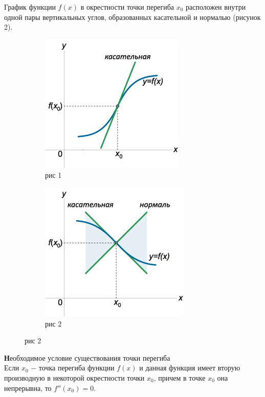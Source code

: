 \documentclass[oneside]{book}
\begin{document}
\begin{enumerate}
\begin{itemize}
\begin{enumerate}
График функции $f\left( x \right)$ в окрестности точки перегиба ${x_0}$ расположен внутри одной пары вертикальных углов, образованных касательной и нормалью (рисунок 2).
\begin{figure}
\centering
\begin{subfigure}{.5\textwidth}
  \centering
  \includegraphics[width=.7\linewidth]{./pics/yyy.jpg}
  \caption{рис 1}
\end{subfigure}%
\begin{subfigure}{.5\textwidth}
  \centering
  \includegraphics[width=.7\linewidth]{./pics/yyy2.jpg}
  \caption{рис 2}
\end{subfigure}
\end{figure}
{\textbf Необходимое условие существования точки перегиба} \\
Если ${x_0}$ − точка перегиба функции $f\left( x \right)$ и данная функция имеет вторую производную в некоторой окрестности точки ${x_0}$, причем в точке ${x_0}$ она непрерывна, то $f''\left( {{x_0}} \right) = 0$.

\end{enumerate}
\end{itemize}
\end{enumerate}
\end{document}
